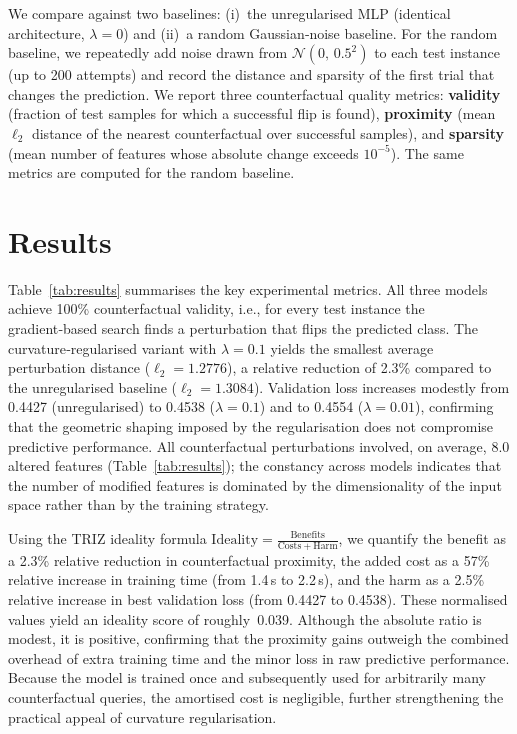 \documentclass[11pt,a4paper]{article}
\begin{document}
We compare against two baselines: (i)~the unregularised MLP (identical architecture, \(\lambda=0\)) and (ii)~a random Gaussian‑noise baseline. For the random baseline, we repeatedly add noise drawn from \(\mathcal{N}(0,\,0.5^2)\) to each test instance (up to 200 attempts) and record the distance and sparsity of the first trial that changes the prediction. We report three counterfactual quality metrics: \textbf{validity} (fraction of test samples for which a successful flip is found), \textbf{proximity} (mean \(\ell_2\) distance of the nearest counterfactual over successful samples), and \textbf{sparsity} (mean number of features whose absolute change exceeds \(10^{-5}\)). The same metrics are computed for the random baseline.

\section{Results}
\label{sec:results}
Table~\ref{tab:results} summarises the key experimental metrics. All three models achieve 100\% counterfactual validity, i.e., for every test instance the gradient‑based search finds a perturbation that flips the predicted class. The curvature‑regularised variant with \(\lambda=0.1\) yields the smallest average perturbation distance (\(\ell_2 = 1.2776\)), a relative reduction of 2.3\% compared to the unregularised baseline (\(\ell_2 = 1.3084\)). Validation loss increases modestly from 0.4427 (unregularised) to 0.4538 (\(\lambda=0.1\)) and to 0.4554 (\(\lambda=0.01\)), confirming that the geometric shaping imposed by the regularisation does not compromise predictive performance. All counterfactual perturbations involved, on average, 8.0 altered features (Table~\ref{tab:results}); the constancy across models indicates that the number of modified features is dominated by the dimensionality of the input space rather than by the training strategy.

Using the TRIZ ideality formula \(\mathrm{Ideality} = \frac{\mathrm{Benefits}}{\mathrm{Costs} + \mathrm{Harm}}\), we quantify the benefit as a 2.3\% relative reduction in counterfactual proximity, the added cost as a 57\% relative increase in training time (from 1.4\,s to 2.2\,s), and the harm as a 2.5\% relative increase in best validation loss (from 0.4427 to 0.4538). These normalised values yield an ideality score of roughly~0.039. Although the absolute ratio is modest, it is positive, confirming that the proximity gains outweigh the combined overhead of extra training time and the minor loss in raw predictive performance. Because the model is trained once and subsequently used for arbitrarily many counterfactual queries, the amortised cost is negligible, further strengthening the practical appeal of curvature regularisation.
\end{document}
